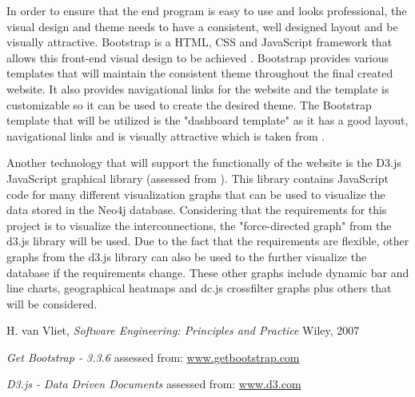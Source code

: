 \documentclass[10pt,onecolumn]{article}
\begin{document}
In order to ensure that the end program is easy to use and looks professional, the visual design and theme needs to have a consistent, well designed layout and be visually attractive. Bootstrap is a HTML, CSS and JavaScript framework that allows this front-end visual design to be achieved \cite{Bootstrap}. Bootstrap provides various templates that will maintain the consistent theme throughout the final created website. It also provides navigational links for the website and the template is customizable so it can be used to create the desired theme. The Bootstrap template that will be utilized is the "dashboard template" as it has a good layout, navigational links and is visually attractive which is taken from \cite{Bootstrap}.

Another technology that will support the functionally of the website is the D3.js JavaScript graphical library (assessed from \cite{D3}). This library contains JavaScript code for many different visualization graphs that can be used to visualize the data stored in the Neo4j database. Considering that the requirements for this project is to visualize the interconnections, the "force-directed graph" from the d3.js library will be used. Due to the fact that the requirements are flexible, other graphs from the d3.js library can also be used to the further visualize the database if the requirements change. These other graphs include dynamic bar and line charts, geographical heatmaps and dc.js crossfilter graphs plus others that will be considered. 

\begin{thebibliography}{1}
	 H. van Vliet, \emph{Software Engineering: Principles
		and Practice} Wiley, 2007
	
	  \emph{Get Bootstrap - 3.3.6} assessed from: \url{www.getbootstrap.com}
	
	  \emph{D3.js - Data Driven Documents} assessed from: \url{www.d3.com}
	
	
\end{thebibliography}

\clearpage
\end{document}
